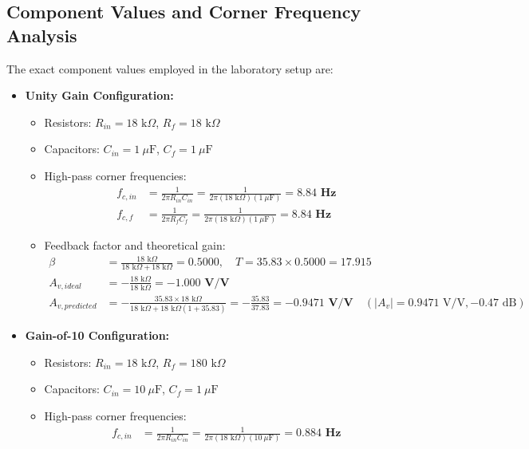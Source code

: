 \documentclass[11pt,a4paper]{article}
\begin{document}
\subsection{Component Values and Corner Frequency Analysis}
The exact component values employed in the laboratory setup are:
\begin{itemize}
    \item \textbf{Unity Gain Configuration:}
    \begin{itemize}
        \item Resistors: $R_{in} = 18\text{ k}\Omega$, $R_f = 18\text{ k}\Omega$
        \item Capacitors: $C_{in} = 1\ \mu\text{F}$, $C_f = 1\ \mu\text{F}$
        \item High-pass corner frequencies:
        \begin{align}
            f_{c,in} &= \frac{1}{2\pi R_{in} C_{in}} = \frac{1}{2\pi (18\text{ k}\Omega)(1\ \mu\text{F})} = \mathbf{8.84\text{ Hz}} \\
            f_{c,f} &= \frac{1}{2\pi R_f C_f} = \frac{1}{2\pi (18\text{ k}\Omega)(1\ \mu\text{F})} = \mathbf{8.84\text{ Hz}}
        \end{align}
        \item Feedback factor and theoretical gain:
        \begin{align}
            \beta &= \frac{18\text{ k}\Omega}{18\text{ k}\Omega + 18\text{ k}\Omega} = 0.5000, \quad T = 35.83 \times 0.5000 = 17.915 \\
            A_{v,ideal} &= -\frac{18\text{ k}\Omega}{18\text{ k}\Omega} = \mathbf{-1.000\text{ V/V}} \\
            A_{v,predicted} &= -\frac{35.83 \times 18\text{ k}\Omega}{18\text{ k}\Omega + 18\text{ k}\Omega(1 + 35.83)} = -\frac{35.83}{37.83} = \mathbf{-0.9471\text{ V/V}} \quad (|A_v| = 0.9471\text{ V/V}, -0.47\text{ dB})
        \end{align}
    \end{itemize}
    \item \textbf{Gain-of-10 Configuration:}
    \begin{itemize}
        \item Resistors: $R_{in} = 18\text{ k}\Omega$, $R_f = 180\text{ k}\Omega$
        \item Capacitors: $C_{in} = 10\ \mu\text{F}$, $C_f = 1\ \mu\text{F}$
        \item High-pass corner frequencies:
        \begin{align}
            f_{c,in} &= \frac{1}{2\pi R_{in} C_{in}} = \frac{1}{2\pi (18\text{ k}\Omega)(10\ \mu\text{F})} = \mathbf{0.884\text{ Hz}} \\

\end{align}
\end{itemize}
\end{itemize}
\end{document}
